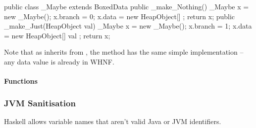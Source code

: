 \documentclass[dissertation.tex]{subfiles}
\begin{document}
{{{{                \begin{javafigure}
                public class _Maybe extends BoxedData {
                    public _make_Nothing() {
                        _Maybe x = new _Maybe();
                        x.branch = 0;
                        x.data = new HeapObject[] {};
                        return x;
                    }
                    public _make_Just(HeapObject val) {
                        _Maybe x = new _Maybe();
                        x.branch = 1;
                        x.data = new HeapObject[] { val };
                        return x;
                    }
                }
                \end{javafigure}

                Note that as  inherits from , the  method has the same simple
                implementation -- any data value is already in WHNF.

            }
            \paragraph*{Functions}
            {

            }
        }
        \subsubsection{JVM Sanitisation}
        {

            Haskell allows variable names that aren't valid Java or JVM identifiers.


        }
    }
}
\end{document}
